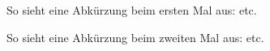 
So sieht eine Abkürzung beim ersten Mal aus: \ac{etc.}

So sieht eine Abkürzung beim zweiten Mal aus: \ac{etc.}


\begin{acronym}[z. B.]


\end{acronym}
